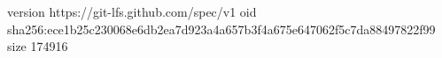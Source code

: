 version https://git-lfs.github.com/spec/v1
oid sha256:ece1b25c230068e6db2ea7d923a4a657b3f4a675e647062f5c7da88497822f99
size 174916
